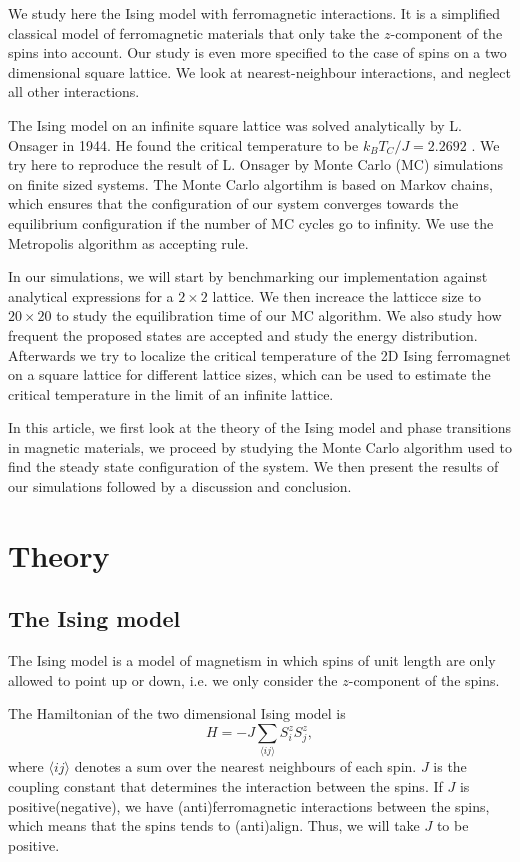 \documentclass[%
 reprint,
nofootinbib,
aps,
]{revtex4-1}
\begin{document}
We study here the Ising model with ferromagnetic interactions. It is a simplified classical model of ferromagnetic materials that only take the $z$-component of the spins into account. Our study is even more specified to the case of spins on a two dimensional square lattice. We look at nearest-neighbour interactions, and neglect all other interactions.

The Ising model on an infinite square lattice was solved analytically by L. Onsager in 1944. He found the critical temperature to be $k_BT_C/J = 2.2692$ \citep{onsager}. We try here to reproduce the result of L. Onsager by Monte Carlo (MC) simulations on finite sized systems. The Monte Carlo algortihm is based on Markov chains, which ensures that the configuration of our system converges towards the equilibrium configuration if the number of MC cycles go to infinity. We use the Metropolis algorithm as accepting rule.

In our simulations, we will start by benchmarking our implementation against analytical expressions for a $2\times 2$ lattice. We then increace the latticce size to $20 \times 20$ to study the equilibration time of our MC algorithm. We also study how frequent the proposed states are accepted and study the energy distribution. Afterwards we try to localize the critical temperature of the 2D Ising ferromagnet on a square lattice for different lattice sizes, which can be used to estimate the critical temperature in the limit of an infinite lattice. 

In this article, we first look at the theory of the Ising model and phase transitions in magnetic materials, we proceed by studying the Monte Carlo algorithm used to find the steady state configuration of the system. We then present the results of our simulations followed by a discussion and conclusion.

\section{Theory}

\subsection{The Ising model}

The Ising model is a model of magnetism in which spins of unit length are only allowed to point up or down, i.e. we only consider the $z$-component of the spins. 

The Hamiltonian of the  two dimensional Ising model is
\begin{equation}\label{eq:Hamiltonian}
H = -J\sum_{\langle ij \rangle}S^z_i S^z_j,
\end{equation}
where $\langle ij \rangle$ denotes a sum over the nearest neighbours of each spin. $J$ is the coupling constant that determines the interaction between the spins. If $J$ is positive(negative), we have (anti)ferromagnetic interactions between the spins, which means that the spins tends to (anti)align. Thus, we will take $J$ to be positive.
\end{document}
